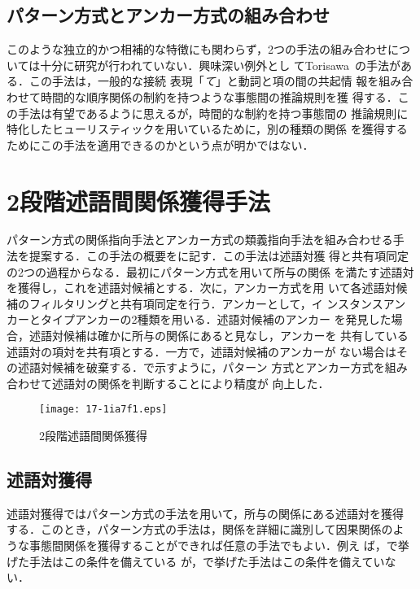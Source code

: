 \documentclass[japanese]{jnlp_1.4}
\begin{document}
\subsection{パターン方式とアンカー方式の組み合わせ}

このような独立的かつ相補的な特徴にも関わらず，2つの手法の組み合わせにつ
いては十分に研究が行われていない．興味深い例外とし
てTorisawa~\cite{torisawa:NAACL}の手法がある．この手法は，一般的な接続
表現「\emph{て}」と動詞と項の間の共起情
報を組み合わせて時間的な順序関係の制約を持つような事態間の推論規則を獲
得する．この手法は有望であるように思えるが，時間的な制約を持つ事態間の
推論規則に特化したヒューリスティックを用いているために，別の種類の関係
を獲得するためにこの手法を適用できるのかという点が明かではない．



\section{2段階述語間関係獲得手法}
\label{sec:method}


パターン方式の関係指向手法とアンカー方式の類義指向手法を組み合わせる手
法を提案する．この手法の概要をに記す．この手法は述語対獲
得と共有項同定の2つの過程からなる．最初にパターン方式を用いて所与の関係
を満たす述語対を獲得し，これを述語対候補とする．次に，アンカー方式を用
いて各述語対候補のフィルタリングと共有項同定を行う．アンカーとして，イ
ンスタンスアンカーとタイプアンカーの2種類を用いる．述語対候補のアンカー
を発見した場合，述語対候補は確かに所与の関係にあると見なし，アンカーを
共有している述語対の項対を共有項とする．一方で，述語対候補のアンカーが
ない場合はその述語対候補を破棄する．で示すように，パターン
方式とアンカー方式を組み合わせて述語対の関係を判断することにより精度が
向上した．

\begin{figure}[p]
\begin{center}
\texttt{[image: 17-1ia7f1.eps]}
\end{center}
\vspace{-3pt}
  \caption{2段階述語間関係獲得}
  \label{fig:overview}
\end{figure}


\subsection{述語対獲得}
\label{ssec:pred_pair}

述語対獲得ではパターン方式の手法を用いて，所与の関係にある述語対を獲得
する．このとき，パターン方式の手法は，関係を詳細に識別して因果関係のよ
うな事態間関係を獲得することができれば任意の手法でもよい．例え
ば，で挙げた手法はこの条件を備えている
が，で挙げた手法はこの条件を備えていない．
\end{document}
